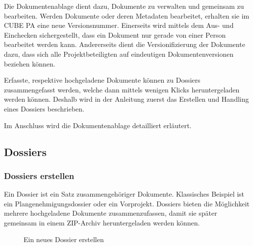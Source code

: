 Die Dokumentenablage dient dazu, Dokumente zu verwalten und gemeinsam zu bearbeiten. Werden Dokumente oder deren Metadaten bearbeitet, erhalten sie im CUBE PA eine neue Versionsnummer. Einerseits wird mittels dem Aus- und Einchecken sichergestellt, dass ein Dokument nur gerade von einer Person bearbeitet werden kann. Andererseits dient die Versionifizierung der Dokumente dazu, dass sich alle Projektbeteiligten auf eindeutigen Dokumentenversionen beziehen können. 

\vspace{1cm}  

Erfasste, respektive hochgeladene Dokumente können zu Dossiers zusammengefasst werden, welche dann mittels wenigen Klicks heruntergeladen werden können. Deshalb wird in der Anleitung zuerst das Erstellen und Handling eines Dossiers beschrieben.

\vspace{\baselineskip}

Im Anschluss wird die Dokumentenablage detailliert erläutert.

\subsection{Dossiers}
\label{bkm:Ref442544219}\subsubsection{Dossiers erstellen}

Ein Dossier ist ein Satz zusammengehöriger Dokumente. Klassisches Beispiel ist ein Plangenehmigungsdossier oder ein Vorprojekt. Dossiers bieten die Möglichkeit mehrere hochgeladene Dokumente zusammenzufassen, damit sie später gemeinsam in einem ZIP-Archiv heruntergeladen werden können.

\begin{figure}[H]
\caption{Ein neues Dossier erstellen}
\end{figure}

